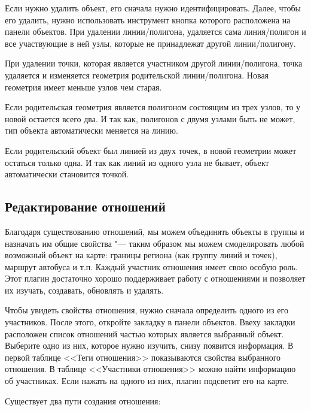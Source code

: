 
Если нужно удалить объект, его сначала нужно идентифицировать. Далее,
чтобы его удалить, нужно использовать инструмент
 кнопка которого
расположена на панели объектов. При удалении линии/полигона, удаляется
сама линия/полигон и все участвующие в ней узлы, которые не принадлежат
другой линии/полигону.

При удалении точки, которая является участником другой линии/полигона,
точка удаляется и изменяется геометрия родительской линии/полигона.
Новая геометрия имеет меньше узлов чем старая.

Если родительская геометрия является полигоном состоящим из трех узлов,
то у новой остается всего два. И так как, полигонов с двумя узлами быть
не может, тип объекта автоматически меняется на линию.

Если родительский объект был линией из двух точек, в новой геометрии
может остаться только одна. И так как линий из одного узла не бывает,
объект автоматически становится точкой.

\subsection{Редактирование отношений}\label{editing_osm_relation}

Благодаря существованию отношений, мы можем объединять объекты в группы
и назначать им общие свойства "--- таким образом мы можем смоделировать
любой возможный объект на карте: границы региона (как группу линий и
точек), маршрут автобуса и т.п. Каждый участник отношения имеет свою
особую роль. Этот плагин достаточно хорошо поддерживает работу с
отношениями и позволяет их изучать, создавать, обновлять и удалять.

\label{examrelation}

Чтобы увидеть свойства отношения, нужно сначала определить одного из его
участников. После этого, откройте закладку  в панели
объектов. Ввеху закладки расположен список отношений частью которых
является выбранный объект. Выберите одно из них, которое нужно изучить,
снизу появится информация. В первой таблице <<Теги отношения>>
показываются свойства выбранного отношения. В таблице <<Участники
отношения>> можно найти информацию об участниках. Если нажать на одного
из них, плагин подсветит его на карте.


Существует два пути создания отношения:

